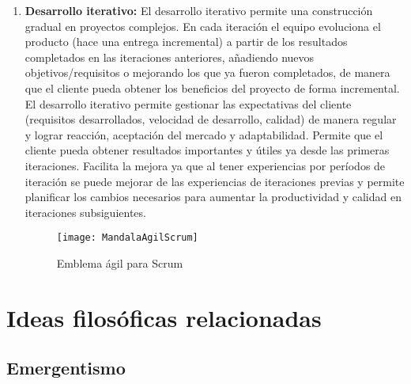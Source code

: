 \begin{enumerate}
\item \textbf{Desarrollo iterativo:} El desarrollo iterativo permite una construcción gradual en proyectos complejos. En cada iteración el equipo evoluciona el producto (hace una entrega incremental) a partir de los resultados completados en las iteraciones anteriores, añadiendo nuevos objetivos/requisitos o mejorando los que ya fueron completados, de manera que el cliente pueda obtener los beneficios del proyecto de forma incremental. El desarrollo iterativo permite gestionar las expectativas del cliente (requisitos desarrollados, velocidad de desarrollo, calidad) de manera regular y lograr reacción, aceptación del mercado y adaptabilidad. Permite que el cliente pueda obtener resultados importantes y útiles ya desde las primeras iteraciones. Facilita la mejora ya que al tener experiencias por períodos de iteración se puede mejorar de las experiencias de iteraciones previas y permite planificar los cambios necesarios para aumentar la productividad y calidad en iteraciones subsiguientes.

\begin{figure}[h]
  \centering
  \texttt{[image: MandalaAgilScrum]}
  \caption{Emblema ágil para Scrum}
  \centering
  \label{fig:MandalaAgilScrum} %
\end{figure}

\end{enumerate}

\section{Ideas filosóficas relacionadas}

\subsection{Emergentismo}

